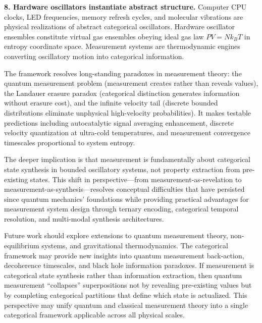 \documentclass[11pt,a4paper]{article}
\theoremstyle{remark}
\begin{document}
\textbf{8. Hardware oscillators instantiate abstract structure.} Computer CPU clocks, LED frequencies, memory refresh cycles, and molecular vibrations are physical realizations of abstract categorical oscillators. Hardware oscillator ensembles constitute virtual gas ensembles obeying ideal gas law $PV = Nk_BT$ in entropy coordinate space. Measurement systems are thermodynamic engines converting oscillatory motion into categorical information.

The framework resolves long-standing paradoxes in measurement theory: the quantum measurement problem (measurement creates rather than reveals values), the Landauer erasure paradox (categorical distinction generates information without erasure cost), and the infinite velocity tail (discrete bounded distributions eliminate unphysical high-velocity probabilities). It makes testable predictions including autocatalytic signal averaging enhancement, discrete velocity quantization at ultra-cold temperatures, and measurement convergence timescales proportional to system entropy.

The deeper implication is that measurement is fundamentally about categorical state synthesis in bounded oscillatory systems, not property extraction from pre-existing states. This shift in perspective—from measurement-as-revelation to measurement-as-synthesis—resolves conceptual difficulties that have persisted since quantum mechanics' foundations while providing practical advantages for measurement system design through ternary encoding, categorical temporal resolution, and multi-modal synthesis architectures.

Future work should explore extensions to quantum measurement theory, non-equilibrium systems, and gravitational thermodynamics. The categorical framework may provide new insights into quantum measurement back-action, decoherence timescales, and black hole information paradoxes. If measurement is categorical state synthesis rather than information extraction, then quantum measurement ``collapses'' superpositions not by revealing pre-existing values but by completing categorical partitions that define which state is actualized. This perspective may unify quantum and classical measurement theory into a single categorical framework applicable across all physical scales.



\end{document}
